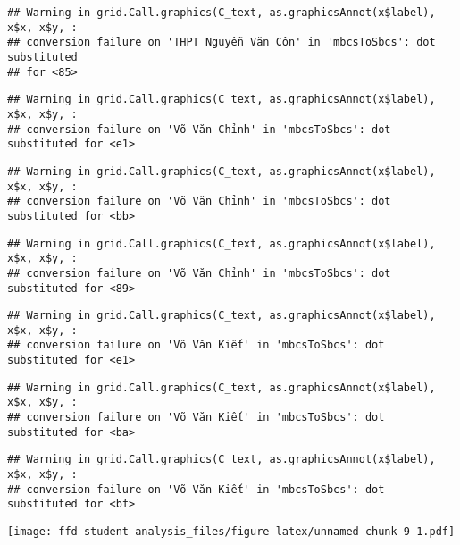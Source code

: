 \documentclass[
]{article}
\begin{document}
\begin{verbatim}
## Warning in grid.Call.graphics(C_text, as.graphicsAnnot(x$label), x$x, x$y, :
## conversion failure on 'THPT Nguyễn Văn Côn' in 'mbcsToSbcs': dot substituted
## for <85>
\end{verbatim}

\begin{verbatim}
## Warning in grid.Call.graphics(C_text, as.graphicsAnnot(x$label), x$x, x$y, :
## conversion failure on 'Võ Văn Chỉnh' in 'mbcsToSbcs': dot substituted for <e1>
\end{verbatim}

\begin{verbatim}
## Warning in grid.Call.graphics(C_text, as.graphicsAnnot(x$label), x$x, x$y, :
## conversion failure on 'Võ Văn Chỉnh' in 'mbcsToSbcs': dot substituted for <bb>
\end{verbatim}

\begin{verbatim}
## Warning in grid.Call.graphics(C_text, as.graphicsAnnot(x$label), x$x, x$y, :
## conversion failure on 'Võ Văn Chỉnh' in 'mbcsToSbcs': dot substituted for <89>
\end{verbatim}

\begin{verbatim}
## Warning in grid.Call.graphics(C_text, as.graphicsAnnot(x$label), x$x, x$y, :
## conversion failure on 'Võ Văn Kiết' in 'mbcsToSbcs': dot substituted for <e1>
\end{verbatim}

\begin{verbatim}
## Warning in grid.Call.graphics(C_text, as.graphicsAnnot(x$label), x$x, x$y, :
## conversion failure on 'Võ Văn Kiết' in 'mbcsToSbcs': dot substituted for <ba>
\end{verbatim}

\begin{verbatim}
## Warning in grid.Call.graphics(C_text, as.graphicsAnnot(x$label), x$x, x$y, :
## conversion failure on 'Võ Văn Kiết' in 'mbcsToSbcs': dot substituted for <bf>
\end{verbatim}

\texttt{[image: ffd-student-analysis\_files/figure-latex/unnamed-chunk-9-1.pdf]}
\end{document}
